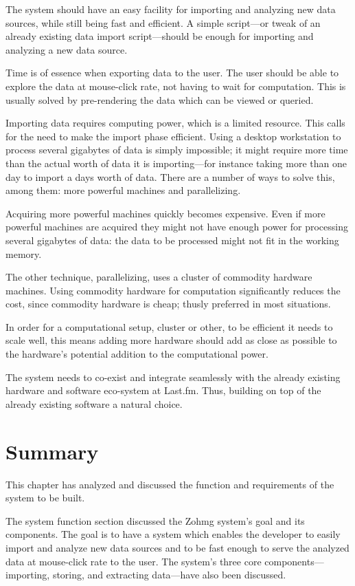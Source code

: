 The system should have an easy facility for importing and analyzing new data
sources, while still being fast and efficient. A simple script---or tweak of an
already existing data import script---should be enough for importing and
analyzing a new data source.

Time is of essence when exporting data to the user. The user should be able to
explore the data at mouse-click rate, not having to wait for computation. This
is usually solved by pre-rendering the data which can be viewed or queried.

Importing data requires computing power, which is a limited resource. This calls
for the need to make the import phase efficient. Using a desktop workstation to
process several gigabytes of data is simply impossible; it might require more
time than the actual worth of data it is importing---for instance taking more
than one day to import a days worth of data. There are a number of ways to solve
this, among them: more powerful machines and parallelizing.

Acquiring more powerful machines quickly becomes expensive. Even if more
powerful machines are acquired they might not have enough power for processing
several gigabytes of data: the data to be processed might not fit in the working
memory.

The other technique, parallelizing, uses a cluster of commodity hardware
machines. Using commodity hardware for computation significantly reduces the
cost, since commodity hardware is cheap; thusly preferred in most situations.

In order for a computational setup, cluster or other, to be efficient it needs
to scale well, this means adding more hardware should add as close as possible
to the hardware's potential addition to the computational power.


The system needs to co-exist and integrate seamlessly with the already existing
hardware and software eco-system at Last.fm. Thus, building on top of the
already existing software a natural choice.


\section*{Summary}

This chapter has analyzed and discussed the function and requirements of the
system to be built.

The system function section discussed the Zohmg system's goal and its
components. The goal is to have a system which enables the developer to easily
import and analyze new data sources and to be fast enough to serve the analyzed
data at mouse-click rate to the user. The system's three core
components---importing, storing, and extracting data---have also been
discussed.


